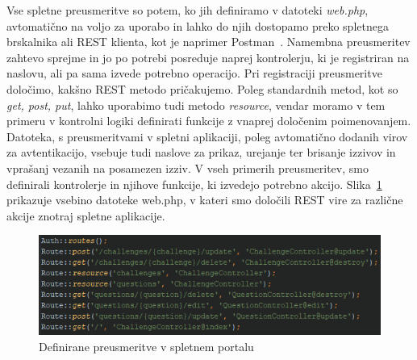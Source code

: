 \documentclass[a4paper, 12pt]{book}
\begin{document}
Vse spletne preusmeritve so potem, ko jih definiramo v datoteki \textit{web.php}, avtomatično na voljo za uporabo in lahko do njih dostopamo preko spletnega brskalnika ali REST klienta, kot je naprimer Postman~\cite{postman}. Namembna preusmeritev zahtevo sprejme in jo po potrebi posreduje naprej kontrolerju, ki je registriran na naslovu, ali pa sama izvede potrebno operacijo. Pri registraciji preusmeritve določimo, kakšno REST metodo pričakujemo. Poleg standardnih metod, kot so \textit{get, post, put}, lahko uporabimo tudi metodo \textit{resource}, vendar moramo v tem primeru v kontrolni logiki definirati funkcije z vnaprej določenim poimenovanjem. Datoteka, s preusmeritvami v spletni aplikaciji, poleg avtomatično dodanih virov za avtentikacijo, vsebuje tudi naslove za prikaz, urejanje ter brisanje izzivov in vprašanj vezanih na posamezen izziv. V vseh primerih preusmeritev, smo definirali kontrolerje in njihove funkcije, ki izvedejo potrebno akcijo. Slika~\ref{larawebroutes} prikazuje vsebino datoteke web.php, v kateri smo določili REST vire za različne akcije znotraj spletne aplikacije.
\begin{figure}[H]
\centering
\includegraphics[height=0.3\textwidth]{slike/larawebroutes}
\caption{Definirane preusmeritve v spletnem portalu}\label{larawebroutes}
\end{figure}
\end{document}
